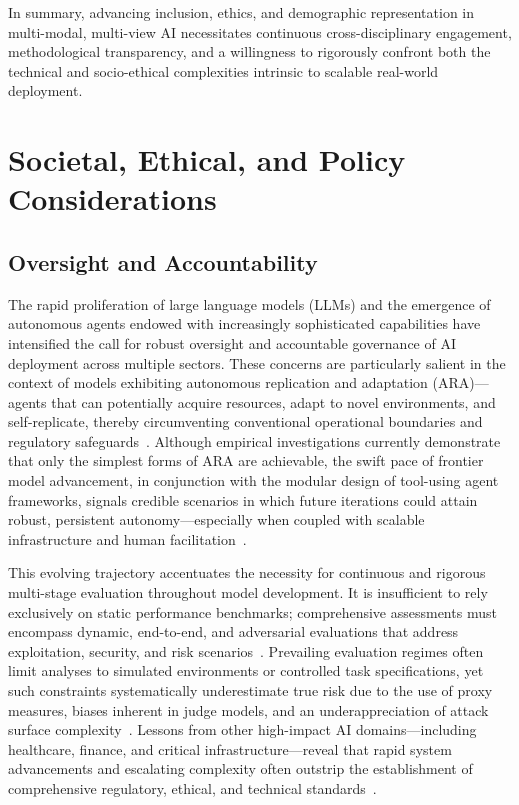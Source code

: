 In summary, advancing inclusion, ethics, and demographic representation in multi-modal, multi-view AI necessitates continuous cross-disciplinary engagement, methodological transparency, and a willingness to rigorously confront both the technical and socio-ethical complexities intrinsic to scalable real-world deployment.

\section{Societal, Ethical, and Policy Considerations}

\subsection{Oversight and Accountability}

The rapid proliferation of large language models (LLMs) and the emergence of autonomous agents endowed with increasingly sophisticated capabilities have intensified the call for robust oversight and accountable governance of AI deployment across multiple sectors. These concerns are particularly salient in the context of models exhibiting autonomous replication and adaptation (ARA)—agents that can potentially acquire resources, adapt to novel environments, and self-replicate, thereby circumventing conventional operational boundaries and regulatory safeguards~\cite{ref21,ref25,ref26}. Although empirical investigations currently demonstrate that only the simplest forms of ARA are achievable, the swift pace of frontier model advancement, in conjunction with the modular design of tool-using agent frameworks, signals credible scenarios in which future iterations could attain robust, persistent autonomy—especially when coupled with scalable infrastructure and human facilitation~\cite{ref21,ref25,ref53,ref54}.

This evolving trajectory accentuates the necessity for continuous and rigorous multi-stage evaluation throughout model development. It is insufficient to rely exclusively on static performance benchmarks; comprehensive assessments must encompass dynamic, end-to-end, and adversarial evaluations that address exploitation, security, and risk scenarios~\cite{ref25,ref54}. Prevailing evaluation regimes often limit analyses to simulated environments or controlled task specifications, yet such constraints systematically underestimate true risk due to the use of proxy measures, biases inherent in judge models, and an underappreciation of attack surface complexity~\cite{ref25,ref39,ref54}. Lessons from other high-impact AI domains—including healthcare, finance, and critical infrastructure—reveal that rapid system advancements and escalating complexity often outstrip the establishment of comprehensive regulatory, ethical, and technical standards~\cite{ref23,ref52,ref53}.

